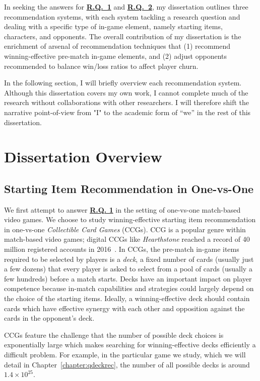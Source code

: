 In seeking the answers for \hyperref[rq1]{\textbf{R.Q.~1}} and \hyperref[rq2]{\textbf{R.Q.~2}}, my dissertation outlines three recommendation systems, with each system tackling a research question and dealing with a specific type of in-game element, namely starting items, characters, and opponents. The overall contribution of my dissertation is the enrichment of  arsenal of recommendation techniques that (1) recommend winning-effective pre-match in-game elements, and (2) adjust opponents recommended to balance win/loss ratios to affect player churn.

In the following section, I will briefly overview each recommendation system. Although this dissertation covers my own work, I cannot complete much of the research without collaborations with other researchers. I will therefore shift the narrative point-of-view from "I" to the academic form of “we” in the rest of this dissertation.


\section{Dissertation Overview}\label{sec:thesis_overview}

\subsection{Starting Item Recommendation in One-vs-One}\label{sec:thesis_overview:item_recom}

We first attempt to answer \hyperref[rq1]{\textbf{R.Q. 1}} in the setting of one-vs-one match-based video games. We choose to study winning-effective starting item recommendation in one-vs-one \textit{Collectible Card Games} (CCGs). CCG is a popular genre within match-based video games; digital CCGs like \textit{Hearthstone} reached a record of 40 million registered accounts in 2016~\cite{hearthstonepopular}. In CCGs, the pre-match in-game items required to be selected by players is a \textit{deck}, a fixed number of cards (usually just a few dozens) that every player is asked to select from a pool of cards (usually a few hundreds) before a match starts. Decks have an important impact on player competence because in-match capabilities and strategies could largely depend on the choice of the starting items. Ideally, a winning-effective deck should contain cards which have effective synergy with each other and opposition against the cards in the opponent's deck. 

CCGs feature the challenge that the number of possible deck choices is exponentially large which makes searching for winning-effective decks efficiently a difficult problem. For example, in the particular game we study, which we will detail in Chapter~\ref{chapter:qdeckrec}, the number of all possible decks is around $1.4 \times 10^{25}$. 

